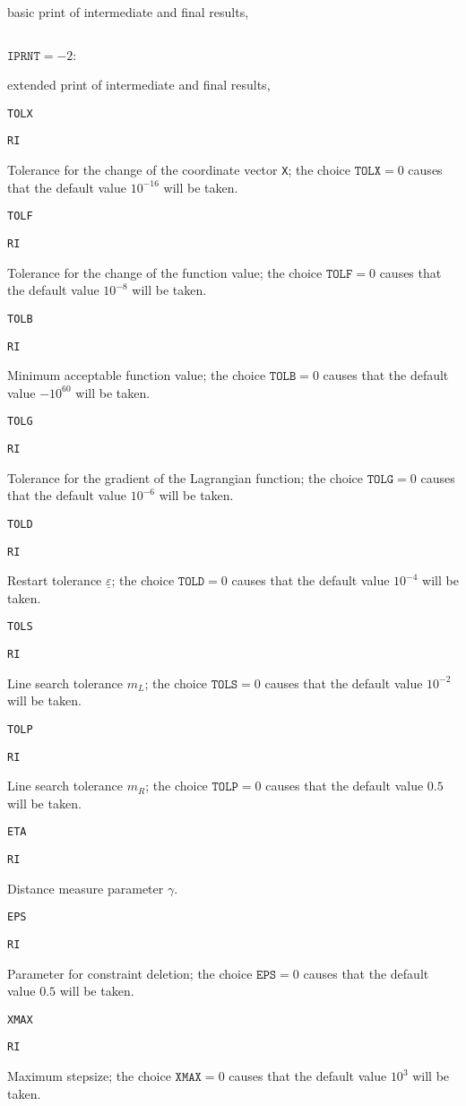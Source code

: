 \documentclass{article}
\begin{document}
{{  basic print of intermediate and final results,}
  \par
\noindent\parbox{30mm}{$\;$}\parbox{20mm}{$\texttt{IPRNT}=-2$:}\parbox[t]{71mm}{
  extended print of intermediate and final results,}
  \par
\noindent\parbox{20mm}{\texttt{TOLX}}\parbox{10mm}{\texttt{RI}}\parbox[t]{91mm}{
  Tolerance for the change of the coordinate vector \texttt{X};
  the choice $\texttt{TOLX}=0$ causes that the default value $10^{-16}$ will be
  taken.}
  \par\vspace{2mm}
\noindent\parbox{20mm}{\texttt{TOLF}}\parbox{10mm}{\texttt{RI}}\parbox[t]{91mm}{
  Tolerance for the change of the function value; the choice
  $\texttt{TOLF}=0$ causes that the default value $10^{-8}$ will be taken.}
  \par\vspace{2mm}
\noindent\parbox{20mm}{\texttt{TOLB}}\parbox{10mm}{\texttt{RI}}\parbox[t]{91mm}{
  Minimum acceptable function value; the choice $\texttt{TOLB}=
  0$ causes that the default value $-10^{60}$ will be taken.}
  \par\vspace{2mm}
\noindent\parbox{20mm}{\texttt{TOLG}}\parbox{10mm}{\texttt{RI}}\parbox[t]{91mm}{
  Tolerance for the gradient of the Lagrangian function; the
  choice $\texttt{TOLG}=0$ causes that the default value $10^{-6}$ will be taken.}
  \par\vspace{2mm}
\noindent\parbox{20mm}{\texttt{TOLD}}\parbox{10mm}{\texttt{RI}}\parbox[t]{91mm}{
  Restart tolerance $\underline{\varepsilon}$; the choice $\texttt{TOLD}=0$
  causes that the default value $10^{-4}$ will be taken.}
  \par\vspace{2mm}
\noindent\parbox{20mm}{\texttt{TOLS}}\parbox{10mm}{\texttt{RI}}\parbox[t]{91mm}{
  Line search tolerance $m_L$; the choice $\texttt{TOLS}=0$
  causes that the default value $10^{-2}$ will be taken.}
  \par\vspace{2mm}
\noindent\parbox{20mm}{\texttt{TOLP}}\parbox{10mm}{\texttt{RI}}\parbox[t]{91mm}{
  Line search tolerance $m_R$; the choice $\texttt{TOLP}=0$
  causes that the default value $0.5$ will be taken.}
  \par\vspace{2mm}
\noindent\parbox{20mm}{\texttt{ETA}}\parbox{10mm}{\texttt{RI}}\parbox[t]{91mm}{
  Distance measure parameter $\gamma$.}
  \par\vspace{2mm}
\noindent\parbox{20mm}{\texttt{EPS}}\parbox{10mm}{\texttt{RI}}\parbox[t]{91mm}{
  Parameter for constraint deletion; the choice $\texttt{EPS}=0$ causes
  that the default value $0.5$ will be taken.}
  \par\vspace{2mm}
\noindent\parbox{20mm}{\texttt{XMAX}}\parbox{10mm}{\texttt{RI}}\parbox[t]{91mm}{
  Maximum stepsize; the choice $\texttt{XMAX}=0$ causes that
  the default value $10^3$ will be taken.}

}
\end{document}
